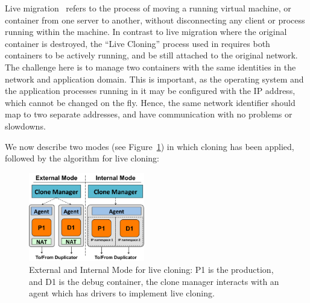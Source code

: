 Live migration~\cite{mirkin2008containers,clark2005live, gebhart2009dynamic} refers to the process of moving a running virtual machine, or container from one server to another, without disconnecting any client or process running within the machine. 
In contrast to live migration where the original container is destroyed, the ``Live Cloning'' process used in \parikshan requires both containers to be actively running, and be still attached to the original network.
The challenge here is to manage two containers with the same identities in the network and application domain. 
This is important, as the operating system and the application processes running in it may be configured with the IP address, which cannot be changed on the fly.
Hence, the same network identifier should map to two separate addresses, and have communication with no problems or slowdowns.

We now describe two modes (see Figure~\ref{fig:modesCloning}) in which cloning has been applied, followed by the algorithm for live cloning:

\begin{figure}[t]
  \begin{center}
    \includegraphics[width=0.45\textwidth]{figs/ModesCloning.pdf}
    \caption{External and Internal Mode for live cloning: P1 is the production, and D1 is the debug container, the clone manager interacts with an agent which has drivers to implement live cloning.}
    \label{fig:modesCloning}
  \end{center}
\end{figure}


